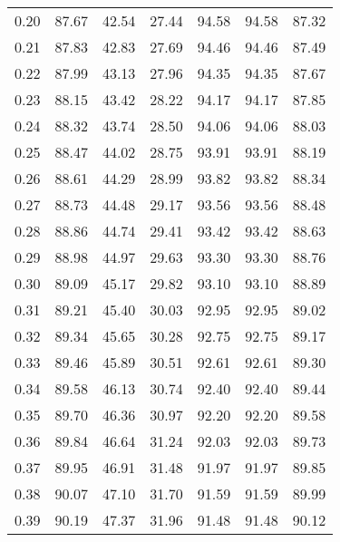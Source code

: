 \begin{tabular}{|c|c|c|c|c|c|c|}
      0.20 &     87.67 &     42.54 &      27.44 &   94.58 &      94.58 &         87.32 \\
      0.21 &     87.83 &     42.83 &      27.69 &   94.46 &      94.46 &         87.49 \\
      0.22 &     87.99 &     43.13 &      27.96 &   94.35 &      94.35 &         87.67 \\
      0.23 &     88.15 &     43.42 &      28.22 &   94.17 &      94.17 &         87.85 \\
      0.24 &     88.32 &     43.74 &      28.50 &   94.06 &      94.06 &         88.03 \\
      0.25 &     88.47 &     44.02 &      28.75 &   93.91 &      93.91 &         88.19 \\
      0.26 &     88.61 &     44.29 &      28.99 &   93.82 &      93.82 &         88.34 \\
      0.27 &     88.73 &     44.48 &      29.17 &   93.56 &      93.56 &         88.48 \\
      0.28 &     88.86 &     44.74 &      29.41 &   93.42 &      93.42 &         88.63 \\
      0.29 &     88.98 &     44.97 &      29.63 &   93.30 &      93.30 &         88.76 \\
      0.30 &     89.09 &     45.17 &      29.82 &   93.10 &      93.10 &         88.89 \\
      0.31 &     89.21 &     45.40 &      30.03 &   92.95 &      92.95 &         89.02 \\
      0.32 &     89.34 &     45.65 &      30.28 &   92.75 &      92.75 &         89.17 \\
      0.33 &     89.46 &     45.89 &      30.51 &   92.61 &      92.61 &         89.30 \\
      0.34 &     89.58 &     46.13 &      30.74 &   92.40 &      92.40 &         89.44 \\
      0.35 &     89.70 &     46.36 &      30.97 &   92.20 &      92.20 &         89.58 \\
      0.36 &     89.84 &     46.64 &      31.24 &   92.03 &      92.03 &         89.73 \\
      0.37 &     89.95 &     46.91 &      31.48 &   91.97 &      91.97 &         89.85 \\
      0.38 &     90.07 &     47.10 &      31.70 &   91.59 &      91.59 &         89.99 \\
      0.39 &     90.19 &     47.37 &      31.96 &   91.48 &      91.48 &         90.12 \\

\end{tabular}
